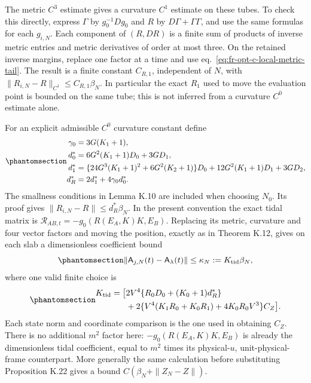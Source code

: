 \documentclass[
  english,
  11pt,
  reqno]{amsart}
\begin{document}
The metric \(C^3\) estimate gives a curvature \(C^1\) estimate on these
tubes. To check this directly, express \(\Gamma\) by \(g_0^{-1}Dg_0\)
and \(R\) by \(D\Gamma+\Gamma\Gamma\), and use the same formulas for
each \(g_{i,N}\). Each component of \((R,DR)\) is a finite sum of
products of inverse metric entries and metric derivatives of order at
most three. On the retained inverse margins, replace one factor at a
time and use eq.~\ref{eq:fr-opt-c-local-metric-tail}. The result is a
finite constant \(C_{R,1}\), independent of \(N\), with
\(\|R_{i,N}-R\|_{C^1}\le C_{R,1}\beta_N\). In particular the exact
\(R_1\) used to move the evaluation point is bounded on the same tube;
this is not inferred from a curvature \(C^0\) estimate alone.

For an explicit admissible \(C^0\) curvature constant define
\begin{equation}\protect\phantomsection\label{eq:fr-opt-c-tidal-input-constants}{
 \begin{aligned}
 \gamma_0&=3G(K_1+1),\\
 d_0^*&=6G^2(K_1+1)D_0+3GD_1,\\
 d_1^*&=\{24G^3(K_1+1)^2+6G^2(K_2+1)\}D_0
          +12G^2(K_1+1)D_1+3GD_2,\\
 d_R^*&=2d_1^*+4\gamma_0d_0^*.
 \end{aligned}
}\end{equation} The smallness conditions in Lemma K.10 are included when
choosing \(N_0\). Its proof gives \(\|R_{i,N}-R\|\le d_R^*\beta_N\). In
the present convention the exact tidal matrix is
\(\mathcal R_{AB,t}=-g_0(R(E_A,K)K,E_B)\). Replacing its metric,
curvature and four vector factors and moving the position, exactly as in
Theorem K.12, gives on each slab a dimensionless coefficient bound
\begin{equation}\protect\phantomsection\label{eq:fr-opt-c-coefficient-bound}{
 \|\mathsf A_{j,N}(t)-\mathsf A_\lambda(t)\|
 \le\kappa_N:=K_{\rm tid}\beta_N,
}\end{equation} where one valid finite choice is
\begin{equation}\protect\phantomsection\label{eq:fr-opt-c-tidal-constant}{
 \begin{aligned}
 K_{\rm tid}=\bigl[&2V^4\{R_0D_0+(K_0+1)d_R^*\}\\
 &+2\{V^4(K_1R_0+K_0R_1)+4K_0R_0V^3\}C_Z\bigr].
 \end{aligned}
}\end{equation} Each state norm and coordinate comparison is the one
used in obtaining \(C_Z\). There is no additional \(m^2\) factor here:
\(-g_0(R(E_A,K)K,E_B)\) is already the dimensionless tidal coefficient,
equal to \(m^2\) times its physical-\(u\), unit-physical-frame
counterpart. More generally the same calculation before substituting
Proposition K.22 gives a bound \(C(\beta_N+\|Z_N-Z\|)\).
\end{document}
